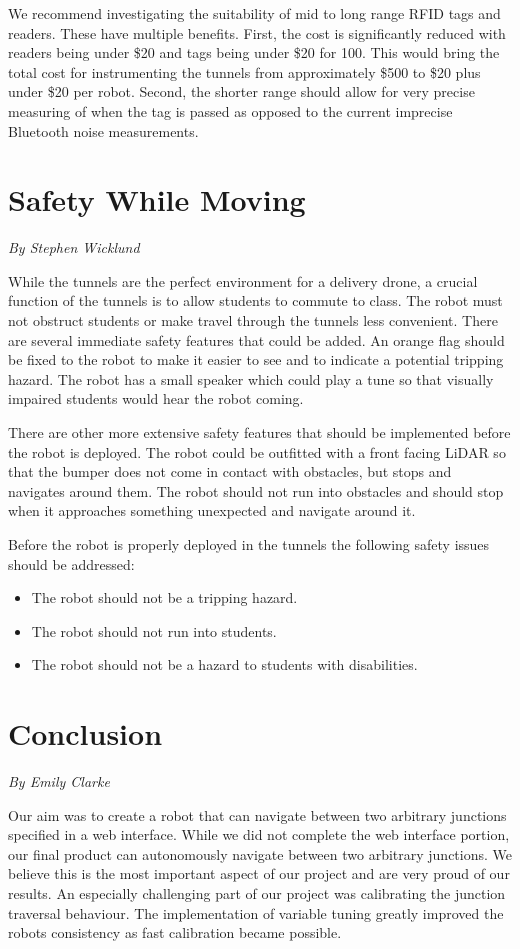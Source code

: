 \documentclass[12pt]{report}
\newcommand{\sectionAuthor}[1]{{\small\vspace{-1em}\textit{#1}}\bigskip\par}
\begin{document}
We recommend investigating the suitability of mid to long range RFID tags and readers. These have multiple benefits. First, the cost is significantly reduced with readers being under \$20 and tags being under \$20 for 100. This would bring the total cost for instrumenting the tunnels from approximately \$500 to \$20 plus under \$20 per robot. Second, the shorter range should allow for very precise measuring of when the tag is passed as opposed to the current imprecise Bluetooth noise measurements.

\section{Safety While Moving}
\label{safety}
\sectionAuthor{By Stephen Wicklund}
While the tunnels are the perfect environment for a delivery drone, a crucial function of the tunnels is to allow students to commute to class. The robot must not obstruct students or make travel through the tunnels less convenient. There are several immediate safety features that could be added. An orange flag should be fixed to the robot to make it easier to see and to indicate a potential tripping hazard. The robot has a small speaker which could play a tune so that visually impaired students would hear the robot coming.

There are other more extensive safety features that should be implemented before the robot is deployed. The robot could be outfitted with a front facing LiDAR so that the bumper does not come in contact with obstacles, but stops and navigates around them. The robot should not run into obstacles and should stop when it approaches something unexpected and navigate around it.

Before the robot is properly deployed in the tunnels the following safety issues should be addressed:
\begin{itemize}
    \item The robot should not be a tripping hazard.
    \item The robot should not run into students.
    \item The robot should not be a hazard to students with disabilities.
\end{itemize}



\section{Conclusion}
\sectionAuthor{By Emily Clarke}
Our aim was to create a robot that can navigate between two arbitrary junctions specified in a web interface. While we did not complete the web interface portion, our final product can autonomously navigate between two arbitrary junctions. We believe this is the most important aspect of our project and are very proud of our results. An especially challenging part of our project was calibrating the junction traversal behaviour. The implementation of variable tuning greatly improved the robots consistency as fast calibration became possible.
\end{document}
